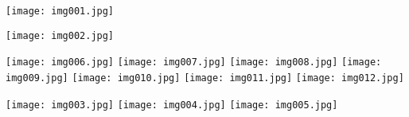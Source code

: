 \documentclass[10pt,letterpaper]{book}
\begin{document}
\tableofcontents

\newpage
{}
{}
\texttt{[image: img001.jpg]}

\newpage
{}
{}
\texttt{[image: img002.jpg]}

\newpage
{}
{}
\texttt{[image: img006.jpg]}
\texttt{[image: img007.jpg]}
\texttt{[image: img008.jpg]}
\texttt{[image: img009.jpg]}
\texttt{[image: img010.jpg]}
\texttt{[image: img011.jpg]}
\texttt{[image: img012.jpg]}

\newpage
{}
{}
\texttt{[image: img003.jpg]}
\texttt{[image: img004.jpg]}
\texttt{[image: img005.jpg]}
\end{document}
